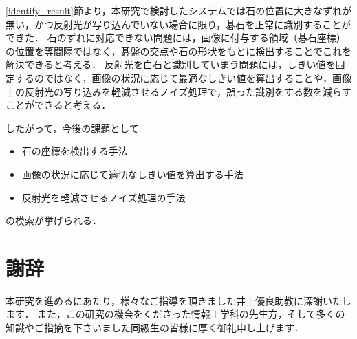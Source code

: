 \documentclass[openright]{nitocs}
\numberwithin{equation}{section}
\begin{document}
        \ref{identify_result}節より，本研究で検討したシステムでは石の位置に大きなずれが無い，かつ反射光が写り込んでいない場合に限り，碁石を正常に識別することができた．
        石のずれに対応できない問題には，画像に付与する領域（碁石座標）の位置を等間隔ではなく，碁盤の交点や石の形状をもとに検出することでこれを解決できると考える．
        反射光を白石と識別していまう問題には，しきい値を固定するのではなく，画像の状況に応じて最適なしきい値を算出することや，画像上の反射光の写り込みを軽減させるノイズ処理で，誤った識別をする数を減らすことができると考える．

        したがって，今後の課題として
        \begin{itemize}
            \item 石の座標を検出する手法
            \item 画像の状況に応じて適切なしきい値を算出する手法
            \item 反射光を軽減させるノイズ処理の手法
        \end{itemize}
        の模索が挙げられる．

    \section*{謝辞} %
        本研究を進めるにあたり，様々なご指導を頂きました井上優良助教に深謝いたします．
        また，この研究の機会をくださった情報工学科の先生方，そして多くの知識やご指摘を下さいました同級生の皆様に厚く御礼申し上げます．
    
\end{document}
